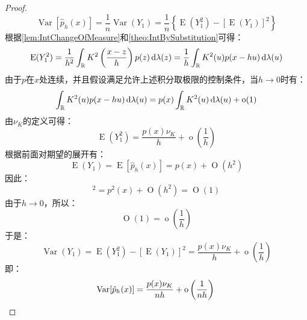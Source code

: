 \begin{proof}
	\begin{equation*}
		\operatorname{Var}[\hat{p}_h(x)]=\frac{1}{n}\operatorname{Var}(Y_1)=\frac{1}{n}\left\{\operatorname{E}(Y_1^2)-[\operatorname{E}(Y_1)]^2\right\}
	\end{equation*}
	根据\cref{lem:IntChangeOfMeasure}和\cref{theo:IntBySubstitution}可得：
	\begin{equation*}
		\operatorname{E}(Y_1^2)=\frac{1}{h^2}\int_{\mathbb{R}}K^2\left(\frac{x-z}{h}\right)p(z)\mathop{}\!\mathrm{d}\lambda(z)=\frac{1}{h}\int_{\mathbb{R}}K^2(u)p(x-hu)\mathop{}\!\mathrm{d}\lambda(u)
	\end{equation*}
	由于$p$在$x$处连续，并且假设满足允许上述积分取极限的控制条件，当$h\to0$时有：
	\begin{equation*}
		\int_{\mathbb{R}}K^2(u)p(x-hu)\mathop{}\!\mathrm{d}\lambda(u)=p(x)\int_{\mathbb{R}}K^2(u)\mathop{}\!\mathrm{d}\lambda(u)+\operatorname{o}(1)
	\end{equation*}
	由$\nu_K$的定义可得：
	\begin{equation*}
		\operatorname{E}(Y_1^2)=\frac{p(x)\nu_K}{h}+\operatorname{o}\left(\frac{1}{h}\right)
	\end{equation*}
	根据前面对期望的展开有：
	\begin{equation*}
		\operatorname{E}(Y_1)=\operatorname{E}[\hat{p}_h(x)]=p(x)+\operatorname{O}(h^2)
	\end{equation*}
	因此：
	\begin{equation*}
		[\operatorname{E}(Y_1)]^2=p^2(x)+\operatorname{O}(h^2)=\operatorname{O}(1)
	\end{equation*}
	由于$h\to0$，所以：
	\begin{equation*}
		\operatorname{O}(1)=\operatorname{o}\left(\frac{1}{h}\right)
	\end{equation*}
	于是：
	\begin{equation*}
		\operatorname{Var}(Y_1)=\operatorname{E}(Y_1^2)-[\operatorname{E}(Y_1)]^2=\frac{p(x)\nu_K}{h}+\operatorname{o}\left(\frac{1}{h}\right)
	\end{equation*}
	即：
	\begin{equation*}
		\operatorname{Var}[\hat{p}_h(x)]=\frac{p(x)\nu_K}{nh}+\operatorname{o}\left(\frac{1}{nh}\right)\qedhere
	\end{equation*}
\end{proof}